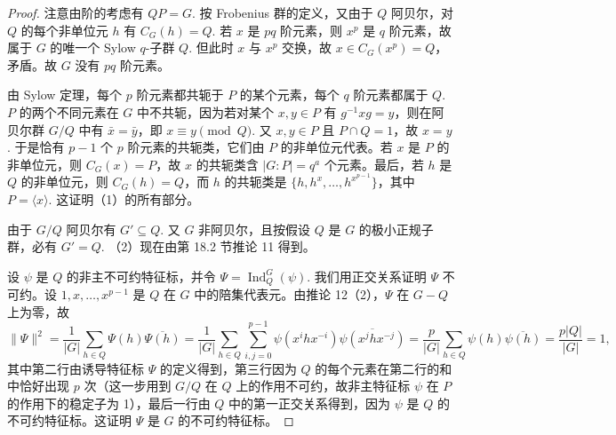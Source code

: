\begin{proof}
注意由阶的考虑有 \(QP = G\). 按 Frobenius 群的定义，又由于 \(Q\) 阿贝尔，对 \(Q\) 的每个非单位元 \(h\) 有 \(C_G(h) = Q\). 若 \(x\) 是 \(pq\) 阶元素，则 \(x^p\) 是 \(q\) 阶元素，故属于 \(G\) 的唯一个 Sylow \(q\)-子群 \(Q\). 但此时 \(x\) 与 \(x^p\) 交换，故 \(x \in C_G(x^p) = Q\)，矛盾。故 \(G\) 没有 \(pq\) 阶元素。

由 Sylow 定理，每个 \(p\) 阶元素都共轭于 \(P\) 的某个元素，每个 \(q\) 阶元素都属于 \(Q\). \(P\) 的两个不同元素在 \(G\) 中不共轭，因为若对某个 \(x, y \in P\) 有 \(g^{-1}xg = y\)，则在阿贝尔群 \(G/Q\) 中有 \(\bar x = \bar y\)，即 \(x \equiv y \pmod Q\). 又 \(x, y \in P\) 且 \(P \cap Q = 1\)，故 \(x = y\). 于是恰有 \(p-1\) 个 \(p\) 阶元素的共轭类，它们由 \(P\) 的非单位元代表。若 \(x\) 是 \(P\) 的非单位元，则 \(C_G(x) = P\)，故 \(x\) 的共轭类含 \(|G : P| = q^a\) 个元素。最后，若 \(h\) 是 \(Q\) 的非单位元，则 \(C_G(h) = Q\)，而 \(h\) 的共轭类是 \(\{h, h^x, \ldots, h^{x^{p-1}}\}\)，其中 \(P = \langle x\rangle\). 这证明（1）的所有部分。

由于 \(G/Q\) 阿贝尔有 \(G' \subseteq Q\). 又 \(G\) 非阿贝尔，且按假设 \(Q\) 是 \(G\) 的极小正规子群，必有 \(G' = Q\). （2）现在由第 18.2 节推论 11 得到。

设 \(\psi\) 是 \(Q\) 的非主不可约特征标，并令 \(\Psi = \operatorname{Ind}_Q^G(\psi)\). 我们用正交关系证明 \(\Psi\) 不可约。设 \(1, x, \ldots, x^{p-1}\) 是 \(Q\) 在 \(G\) 中的陪集代表元。由推论 12（2），\(\Psi\) 在 \(G - Q\) 上为零，故
\[
\|\Psi\|^2 = \frac{1}{|G|}\sum_{h \in Q}\Psi(h)\overline{\Psi(h)}
= \frac{1}{|G|}\sum_{h \in Q}\sum_{i,j=0}^{p-1}\psi(x^ihx^{-i})\overline{\psi(x^jhx^{-j})}
= \frac{p}{|G|}\sum_{h \in Q}\psi(h)\overline{\psi(h)}
= \frac{p|Q|}{|G|} = 1,
\]
其中第二行由诱导特征标 \(\Psi\) 的定义得到，第三行因为 \(Q\) 的每个元素在第二行的和中恰好出现 \(p\) 次（这一步用到 \(G/Q\) 在 \(Q\) 上的作用不可约，故非主特征标 \(\psi\) 在 \(P\) 的作用下的稳定子为 1），最后一行由 \(Q\) 中的第一正交关系得到，因为 \(\psi\) 是 \(Q\) 的不可约特征标。这证明 \(\Psi\) 是 \(G\) 的不可约特征标。


\end{proof}
